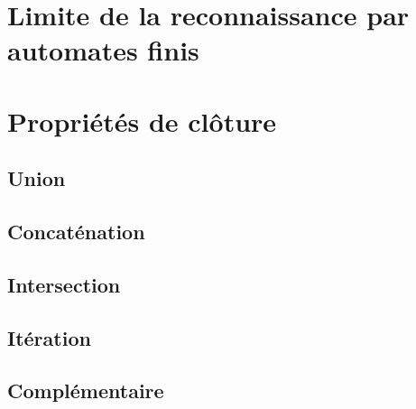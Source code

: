 \section{Limite de la reconnaissance par automates finis}

\section{Propriétés de clôture}
\label{cloture}
\subsection{Union}

\subsection{Concaténation}

\subsection{Intersection}

\subsection{Itération}

\subsection{Complémentaire}

